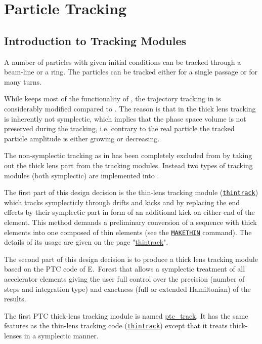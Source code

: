 \chapter{Particle Tracking}
\label{chap:tracking}


\section{Introduction to \madx Tracking Modules}
\label{sec:trackintro}

A number of particles with given initial conditions can be tracked
through a beam-line or a ring. The particles can be tracked either for a
single passage or for many turns.  


While \madx keeps most of the functionality of \madeight, the
trajectory tracking in \madx is considerably modified compared to
\madeight. 
The reason is that in \madeight the thick lens tracking is inherently not
symplectic, which implies that the phase space volume is not preserved
during the tracking, i.e. contrary to the real particle the tracked
particle amplitude is either growing or decreasing. 


The non-symplectic tracking as in \madeight has been completely excluded
from \madx by taking out the thick lens part from the tracking
modules. Instead two types of tracking modules (both symplectic) are
implemented into \madx. 


The first part of this design decision is the thin-lens tracking module
(\texttt{\href{../thintrack/thintrack.html}{thintrack}})  which tracks
symplecticly through drifts and kicks and by replacing the end effects
by their symplectic part in form of an additional kick on either  end of
the element. This method demands a preliminary conversion of a sequence
with thick elements into one composed of thin elements (see the
\texttt{\href{../makethin/makethin.html}{MAKETHIN}} command). The
details of its usage are given on the page
"\href{../thintrack/thintrack.html}{thintrack}". 


The second part of this design decision is to produce a thick lens
tracking module based on the PTC code of E.~Forest that
allows a symplectic treatment of all accelerator elements giving the
user full control over the precision (number of steps and integration
type) and exactness (full or extended Hamiltonian) of the results. 


The first PTC thick-lens tracking module is named
\href{../ptc_track/ptc_track.html}{ptc\_track}. 
It has the same features as the thin-lens tracking code
(\texttt{\href{../thintrack/thintrack.html}{thintrack}}) except that it
treats thick-lenses in a symplectic manner. 


